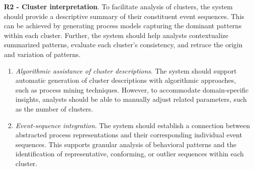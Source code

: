 \documentclass[preprint,journal]{vgtc}            %
\begin{document}
\noindent 
\textbf{R2 - Cluster interpretation}. 
To facilitate analysis of clusters, the system should provide a descriptive summary of their constituent event sequences.
This can be achieved by generating process models capturing the dominant patterns within each cluster. 
Further, the system should help analysts contextualize summarized patterns, evaluate each cluster's consistency, and retrace the origin and variation of patterns.
\begin{enumerate}[label=T\arabic*., start=3, left=0cm, noitemsep, topsep=0pt, parsep=0pt]
    \item \textit{Algorithmic assistance of cluster descriptions}. 
    The system should support automatic generation of cluster descriptions with algorithmic approaches, such as process mining techniques.
    However, to accommodate domain-specific insights, analysts should be able to manually adjust related parameters, such as the number of clusters.

    \item \textit{Event-sequence integration}. 
    The system should establish a connection between abstracted process representations and their corresponding individual event sequences.
    This supports granular analysis of behavioral patterns and the identification of representative, conforming, or outlier sequences within each cluster.
\end{enumerate}
\end{document}
